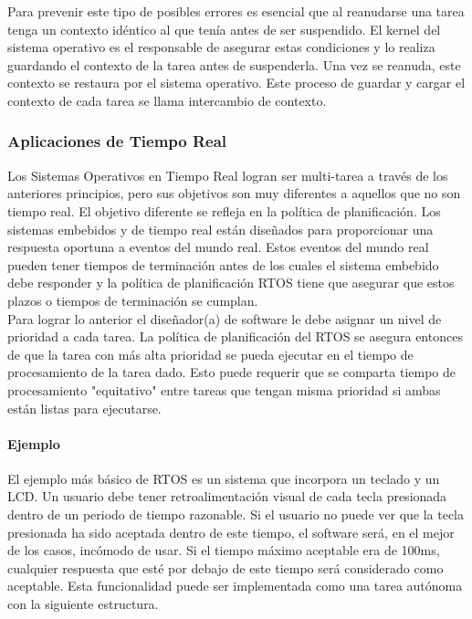 Para prevenir este tipo de posibles errores es esencial que al reanudarse una tarea tenga un contexto idéntico al que tenía antes de ser suspendido. El kernel del sistema operativo es el responsable de asegurar estas condiciones y lo realiza guardando el contexto de la tarea antes de suspenderla. Una vez se reanuda, este contexto se restaura por el sistema operativo. Este proceso de guardar y cargar el contexto de cada tarea se llama intercambio de contexto.

\subsubsection{Aplicaciones de Tiempo Real}

Los Sistemas Operativos en Tiempo Real logran ser multi-tarea a través de los anteriores principios, pero sus objetivos son muy diferentes a aquellos que no son tiempo real. El objetivo diferente se refleja en la política de planificación. Los sistemas embebidos y de tiempo real están diseñados para proporcionar una respuesta oportuna a eventos del mundo real. Estos eventos del mundo real pueden tener tiempos de terminación antes de los cuales el sistema embebido debe responder y la política de planificación RTOS tiene que asegurar que estos plazos o tiempos de terminación se cumplan. \\

Para lograr lo anterior el diseñador(a) de software le debe asignar un nivel de prioridad a cada tarea. La política de planificación del RTOS se asegura entonces de que la tarea con más alta prioridad se pueda ejecutar en el tiempo de procesamiento de la tarea dado. Esto puede requerir que se comparta tiempo de procesamiento "equitativo" entre tareas que tengan misma prioridad si ambas están listas para ejecutarse.

\paragraph{Ejemplo} El ejemplo más básico de RTOS es un sistema que incorpora un teclado y un LCD. Un usuario debe tener retroalimentación visual de cada tecla presionada dentro de un periodo de tiempo razonable. Si el usuario no puede ver que la tecla presionada ha sido aceptada dentro de este tiempo, el software será, en el mejor de los casos, incómodo de usar. Si el tiempo máximo aceptable era de 100ms, cualquier respuesta que esté por debajo de este tiempo será considerado como aceptable. Esta funcionalidad puede ser implementada como una tarea autónoma con la siguiente estructura.

